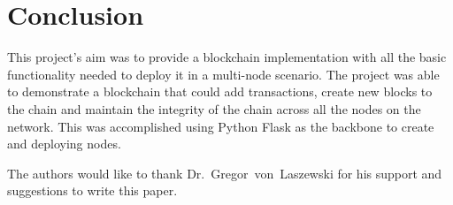 \section{Conclusion}

This project's aim was to provide a blockchain implementation with all the basic functionality needed to deploy it in a multi-node scenario. The project was able to demonstrate a blockchain that could add transactions, create new blocks to the chain and maintain the integrity of the chain across all the nodes on the network. This was accomplished using Python Flask as the backbone to create and deploying nodes.

\begin{acks}

  The authors would like to thank Dr.~Gregor~von~Laszewski for his
  support and suggestions to write this paper.

\end{acks}


 

